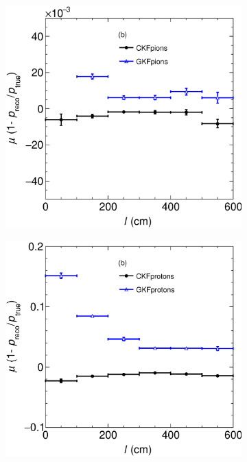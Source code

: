 \begin{figure}[t]
\begin{subfigure}{0.32\textwidth}
         \caption{}
         \label{fig:pBiasVSLength13_Int}
     \end{subfigure}
     \begin{subfigure}{0.32\textwidth}
         \centering
         \includegraphics[width=\textwidth]{figures/ch5-KF_NDGAr/FullSample/Int/pRes/2D/BiaspVSLength_211.eps}
         \caption{}
         \label{fig:pBiasVSLength211_Int}
     \end{subfigure}
          \begin{subfigure}{0.32\textwidth}
         \centering
         \includegraphics[width=\textwidth]{figures/ch5-KF_NDGAr/FullSample/Int/pRes/2D/BiaspVSLength_2212.eps}

\end{subfigure}
\end{figure}
